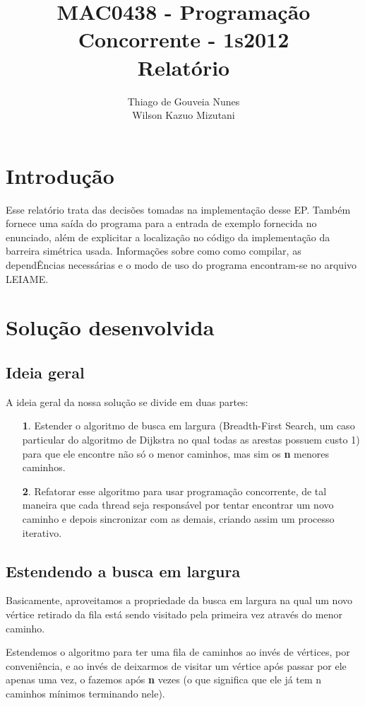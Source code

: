 \documentclass[a4paper,11pt]{article}
\title{MAC0438 - Programação Concorrente - 1s2012 \\ Relatório}
\author{Thiago de Gouveia Nunes \\ Wilson Kazuo Mizutani}
\begin{document}
\maketitle
\tableofcontents

\clearpage
\section{Introdução}
  Esse relatório trata das decisões tomadas na implementação desse EP. Também
fornece uma saída do programa para a entrada de exemplo fornecida no enunciado,
além de explicitar a localização no código da implementação da barreira
simétrica usada.
  Informações sobre como como compilar, as dependÊncias necessárias e o modo de
uso do programa encontram-se no arquivo LEIAME.

\section{Solução desenvolvida}

  \subsection{Ideia geral}
    A ideia geral da nossa solução se divide em duas partes:
      \begin{itemize}
        \item[\textbf 1.]
          Estender o algoritmo de busca em largura (Breadth-First Search, um
          caso particular do algoritmo de Dijkstra no qual todas as arestas
          possuem custo 1) para que ele encontre não só o menor caminhos, mas
          sim os {\textbf n} menores caminhos.
        \item[\textbf 2.]
          Refatorar esse algoritmo para usar programação concorrente, de tal
          maneira que cada thread seja responsável por tentar encontrar um novo
          caminho e depois sincronizar com as demais, criando assim um processo
          iterativo.
      \end{itemize}

  \subsection{Estendendo a busca em largura}
    Basicamente, aproveitamos a propriedade da busca em largura na qual um novo
    vértice retirado da fila está sendo visitado pela primeira vez através do
    menor caminho.

    Estendemos o algoritmo para ter uma fila de caminhos ao invés de vértices,
    por conveniência, e ao invés de deixarmos de visitar um vértice após passar
    por ele apenas uma vez, o fazemos após \textbf{n} vezes (o que significa
    que ele já tem n caminhos mínimos terminando nele).
\end{document}
